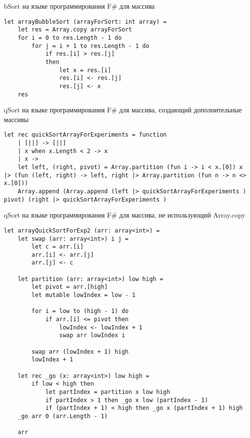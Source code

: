 \begin{algorithm}[H]
\caption{bSort на языке программирования F\# для массива}
\label{lst:bSortArray}
\begin{verbatim}
let arrayBubbleSort (arrayForSort: int array) =
    let res = Array.copy arrayForSort
    for i = 0 to res.Length - 1 do
        for j = i + 1 to res.Length - 1 do
            if res.[i] > res.[j]
            then
                let x = res.[i]
                res.[i] <- res.[j]
                res.[j] <- x
    res
\end{verbatim}
\end{algorithm}
\begin{algorithm}[H]
\caption{qSort на языке программирования F\# для массива, создающий дополнительные массивы}
\label{lst:qSortArrayExp}
\begin{verbatim}
let rec quickSortArrayForExperiments = function
    | [||] -> [||]
    | x when x.Length < 2 -> x
    | x ->
    let left, (right, pivot) = Array.partition (fun i -> i < x.[0]) x |> (fun (left, right) -> left, right |> Array.partition (fun n -> n <> x.[0]))
    Array.append (Array.append (left |> quickSortArrayForExperiments ) pivot) (right |> quickSortArrayForExperiments )
\end{verbatim}
\end{algorithm}
\begin{algorithm}[H]
\caption{qSort на языке программирования F\# для массива, не использующий Array.copy}
\label{lst:qSortArrayExp2}
\begin{verbatim}
let arrayQuickSortForExp2 (arr: array<int>) =
    let swap (arr: array<int>) i j =
        let c = arr.[i]
        arr.[i] <- arr.[j]
        arr.[j] <- c

    let partition (arr: array<int>) low high =
        let pivot = arr.[high]
        let mutable lowIndex = low - 1

        for i = low to (high - 1) do
            if arr.[i] <= pivot then
                lowIndex <- lowIndex + 1
                swap arr lowIndex i

        swap arr (lowIndex + 1) high
        lowIndex + 1

    let rec _go (x: array<int>) low high =
        if low < high then
            let partIndex = partition x low high
            if partIndex > 1 then _go x low (partIndex - 1)
            if (partIndex + 1) < high then _go x (partIndex + 1) high
    _go arr 0 (arr.Length - 1)

    arr
\end{verbatim}
\end{algorithm}

